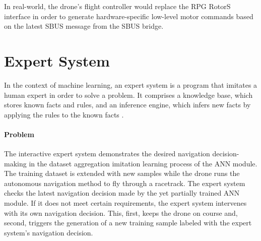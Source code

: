 In real-world, the drone's flight controller would replace the 
RPG RotorS interface in order to generate hardware-specific low-level
motor commands based on the latest SBUS message from the SBUS bridge.








\section{Expert System} \label{sec:expert_system}

In the context of machine learning, 
an expert system is a program that imitates a human expert
in order to solve a problem. 
It comprises a knowledge base,
which stores known facts and rules, and an
inference engine, which infers new facts 
by applying the rules to the known facts \cite{osti_5675197}.

\paragraph*{Problem} $\ $\\
The interactive expert system 
demonstrates the desired navigation decision-making
in the dataset aggregation imitation learning process of the ANN module.
The training dataset is extended with new samples 
while the drone runs the autonomous navigation method to fly through a racetrack.
The expert system checks the latest navigation decision 
made by the yet partially trained ANN module.
If it does not meet certain requirements,
the expert system intervenes with its own navigation decision.
This, first, keeps the drone on course and, second,
triggers the generation of a new training sample labeled 
with the expert system's navigation decision.

